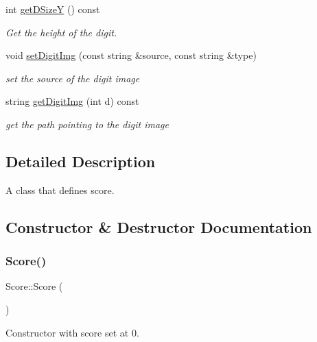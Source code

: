 \begin{DoxyCompactItemize}
int \mbox{\hyperlink{class_score_ae7da6b9ad72bb407098a37aecc085d28}{get\+D\+SizeY}} () const
\begin{DoxyCompactList}\small\item\em Get the height of the digit. \end{DoxyCompactList}\item 
void \mbox{\hyperlink{class_score_aa832d21b704451b0a1d9f354d1bd1af2}{set\+Digit\+Img}} (const string \&source, const string \&type)
\begin{DoxyCompactList}\small\item\em set the source of the digit image \end{DoxyCompactList}\item 
string \mbox{\hyperlink{class_score_ac707716778b5df8de509549441fe9eeb}{get\+Digit\+Img}} (int d) const
\begin{DoxyCompactList}\small\item\em get the path pointing to the digit image \end{DoxyCompactList}\end{DoxyCompactItemize}


\subsection{Detailed Description}
A class that defines score. 

\subsection{Constructor \& Destructor Documentation}
\mbox{\label{class_score_a039c99843551e5e4b512ecee99e46617}} 
\subsubsection{\texorpdfstring{Score()}{Score()}\hspace{0.1cm}{\footnotesize\ttfamily [1/2]}}
{\footnotesize\ttfamily Score\+::\+Score (\begin{DoxyParamCaption}{ }\end{DoxyParamCaption})\hspace{0.3cm}{\ttfamily [inline]}}



Constructor with score set at 0. 

\mbox{\label{class_score_ad7549208ba985c6f0ddf53179a07ebcb}} 
